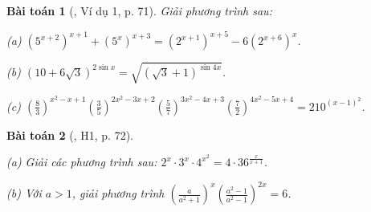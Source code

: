 \documentclass{article}
\numberwithin{equation}{section}
\newtheorem{baitoan}{Bài toán}[section]
\begin{document}
\begin{baitoan}[\cite{TL_chuyen_Toan_Giai_Tich_12}, Ví dụ 1, p. 71]
	Giải phương trình sau:
	\begin{enumerate*}
		\item[(a)] $(5^{x+2})^{x+1} + (5^x)^{x+3} = (2^{x+1})^{x+5} - 6(2^{x+6})^x$.
		\item[(b)] $(10 + 6\sqrt{3})^{2\sin x} = \sqrt{(\sqrt{3} + 1)^{\sin 4x}}$.
		\item[(c)] $\left(\frac{8}{3}\right)^{x^2 - x + 1}\left(\frac{3}{5}\right)^{2x^2 - 3x + 2}\left(\frac{5}{7}\right)^{3x^2 - 4x + 3}\left(\frac{7}{2}\right)^{4x^2 - 5x + 4} = 210^{(x - 1)^2}$.
	\end{enumerate*}
\end{baitoan}

\begin{baitoan}[\cite{TL_chuyen_Toan_Giai_Tich_12}, H1, p. 72]
	\begin{enumerate*}
		\item[(a)] Giải các phương trình sau: $2^x\cdot 3^x\cdot 4^{x^2} = 4\cdot 36^{\frac{x}{x + 1}}$.
		\item[(b)] Với $a > 1$, giải phương trình $\left(\frac{a}{a^2 + 1}\right)^x\left(\frac{a^2 - 1}{a^2 - 1}\right)^{2x} = 6$.
	\end{enumerate*}
\end{baitoan}




\printbibliography[heading=bibintoc]
	
\end{document}
